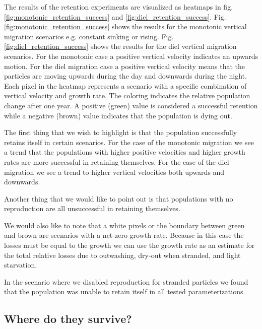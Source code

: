 \documentclass[npg, manuscript]{copernicus}
\begin{document}
The results of the retention experiments are visualized as heatmaps in fig. \ref{fig:monotonic_retention_success} and \ref{fig:diel_retention_success}.
Fig. \ref{fig:monotonic_retention_success} shows the results for the monotonic vertical migration scenarios e.g. constant sinking or rising.
Fig. \ref{fig:diel_retention_success} shows the results for the diel vertical migration scenarios. For the monotonic case a positive vertical velocity indicates an upwards motion. For the diel migration case a positive vertical velocity means that the particles are moving upwards during the day and downwards during the night.
Each pixel in the heatmap represents a scenario with a specific combination of vertical velocity and growth rate.
The coloring indicates the relative population change after one year. A positive (green) value is considered a successful retention while a negative (brown) value indicates that the population is dying out.

The first thing that we wish to highlight is that the population successfully retains itself in certain scenarios. For the case of the monotonic migration we see a trend that the populations with higher positive velocities and higher growth rates are more successful in retaining themselves.
For the case of the diel migration we see a trend to higher vertical velocities both upwards and downwards.

Another thing that we would like to point out is that populations with no reproduction are all unsuccessful in retaining themselves.

We would also like to note that a white pixels or the boundary between green and brown are scenarios with a net-zero growth rate. Because in this case the losses must be equal to the growth we can use the growth rate as an estimate for the total relative losses due to outwashing, dry-out when stranded, and light starvation.

\medskip

In the scenario where we disabled reproduction for stranded particles we found that the population was unable to retain itself in all tested parameterizations.


\subsection{Where do they survive?}
\end{document}
